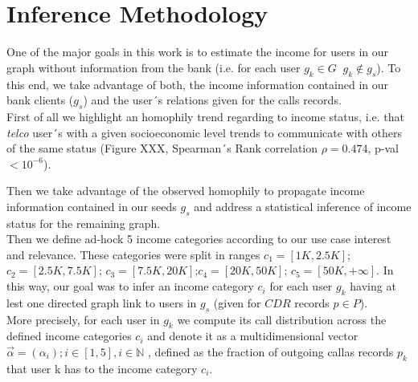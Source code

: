 \section{Inference Methodology}






One of the major goals in this work is to estimate the income for users in our graph without information from the bank (i.e. for each user $g_k \in G $ $\ g_k \notin g_s$). To this end, we take advantage of both, the income information contained in our bank clients ($g_s$) and the user´s relations given for the calls records. \\

First of all we highlight an homophily trend regarding to income status, i.e. that \textit{telco} user´s with a given socioeconomic level trends to communicate with others of the same status (Figure XXX, Spearman´s Rank correlation $\rho= 0.474$, p-val$<10^{-6}$). 

Then we take advantage of the observed homophily to propagate income information contained in our seeds $g_s$ and address a statistical inference of income status for the remaining graph. \\

Then we define ad-hock 5 income categories according to our use case interest and relevance. These categories were split in ranges $c_1=[1K,2.5K]$; $c_2=[2.5K,7.5K]$; $c_3=[7.5K,20K]$;$c_4=[20K,50K]$; $c_5=[50K,+ \infty]$.  In this way, our goal was to infer an income category $c_i$ for each user $g_k$ having at lest one directed graph link to users in $g_s$ (given for $CDR$ records  $p\in P$).\\

More precisely, for each user in $g_k$ we compute its call distribution across the defined income categories $c_i$ and denote it as a multidimensional vector $\vec{\alpha} =(\alpha_i); i \in [1,5], i\in \mathbb{N}$ , defined as the fraction of outgoing callas records $p_k$ that user k has to the income category $c_i$. 


